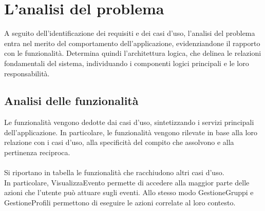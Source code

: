 \section{L’analisi del problema}

A seguito dell'identificazione dei requisiti e dei casi d'uso,
l'analisi del problema entra nel merito del comportamento dell'applicazione,
evidenziandone il rapporto con le funzionalità.
Determina quindi l'architettura logica, che delinea le relazioni fondamentali del sistema,
individuando i componenti logici principali e le loro responsabilità.\\

\subsection{Analisi delle funzionalità}

Le funzionalità vengono dedotte dai casi d'uso, sintetizzando i servizi principali dell'applicazione.
In particolare, le funzionalità vengono rilevate in base alla loro relazione con i casi d'uso,
alla specificità del compito che assolvono e alla pertinenza reciproca.\\
\\
Si riportano in tabella le funzionalità che racchiudono altri casi d'uso.\\
In particolare, VisualizzaEvento permette di accedere alla maggior parte delle azioni
che l'utente può attuare sugli eventi.
Allo stesso modo GestioneGruppi e GestioneProfili
permettono di eseguire le azioni correlate al loro contesto.\\

